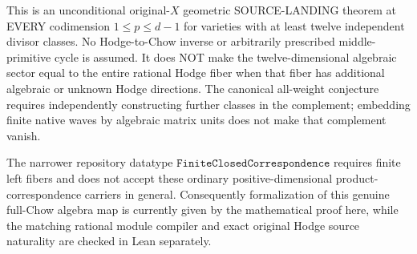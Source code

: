 \documentclass[11pt]{article}
\begin{document}
This is an unconditional original-$X$ geometric SOURCE-LANDING
theorem at EVERY codimension $1\le p\le d-1$
for varieties with at least twelve independent divisor classes.
No Hodge-to-Chow inverse or arbitrarily prescribed middle-primitive
cycle is assumed. It does NOT make the twelve-dimensional
algebraic sector equal to the entire rational Hodge fiber
when that fiber has additional algebraic or unknown Hodge
directions. The canonical all-weight conjecture requires
independently constructing further classes in the
complement; embedding finite native waves by algebraic
matrix units does not make that complement vanish.

The narrower repository datatype
$\texttt{FiniteClosedCorrespondence}$ requires
finite left fibers and does not accept these ordinary
positive-dimensional product-correspondence carriers
in general. Consequently formalization of this genuine
full-Chow algebra map is currently given
by the mathematical proof here, while the matching
rational module compiler and exact original Hodge source
naturality are checked in Lean separately.
\end{document}
